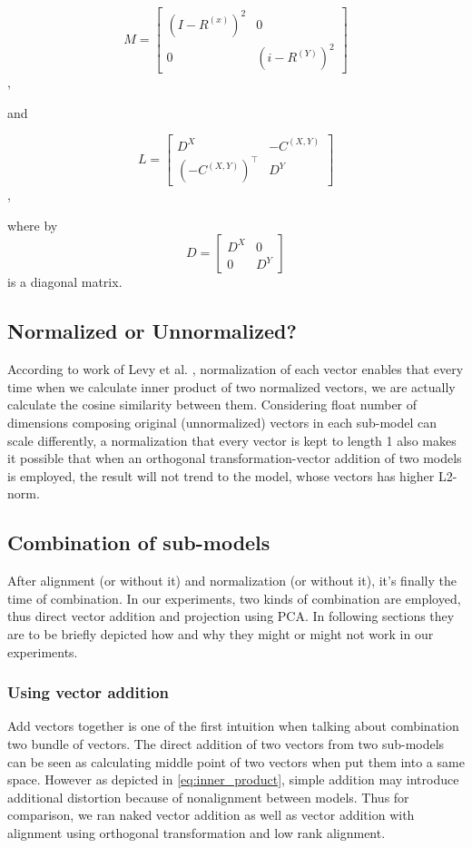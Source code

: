 \documentclass[11pt,a4paper]{article}
\begin{document}
  \[M=\begin{bmatrix}
    (I-R^{(x)})^2 & 0\\
    0 & (i-R^{(Y)})^2
    \end{bmatrix}\],

  and

  \[L=\begin{bmatrix}
    D^X & -C^{(X,Y)}\\
    (-C^{(X,Y)})^\intercal & D^Y
    \end{bmatrix}\],

  where by \[D=\begin{bmatrix}D^X & 0\\0 & D^Y\end{bmatrix}\] is a diagonal matrix.
  \subsection{Normalized or Unnormalized?}
  According to work of Levy et al. \cite{levy2015improving}, normalization of each vector enables that every time when we calculate inner product of two normalized vectors, we are actually calculate the cosine similarity between them. Considering float number of dimensions composing original (unnormalized) vectors in each sub-model can scale differently, a normalization that every vector is kept to length 1 also makes it possible that when an orthogonal transformation-vector addition of two models is employed, the result will not trend to the model, whose vectors has higher L2-norm.

  \subsection{Combination of sub-models}
  After alignment (or without it) and normalization (or without it), it's finally the time of combination. In our experiments, two kinds of combination are employed, thus direct vector addition and projection using PCA. In following sections they are to be briefly depicted how and why they might or might not work in our experiments.

  \subsubsection{Using vector addition}
  Add vectors together is one of the first intuition when talking about combination two bundle of vectors. The direct addition of two vectors from two sub-models can be seen as calculating middle point of two vectors when put them into a same space. However as depicted in \eqref{eq:inner_product}, simple addition may introduce additional distortion because of nonalignment between models. Thus for comparison, we ran naked vector addition as well as vector addition with alignment using orthogonal transformation and low rank alignment.
\end{document}
